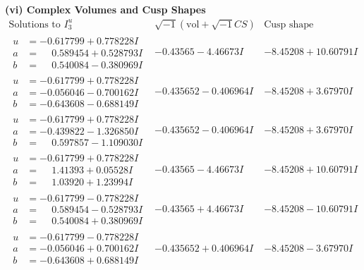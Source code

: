 \documentclass[1p]{elsarticle_modified}
\theoremstyle{definition}
\newcommand{\I}{\sqrt{-1}}
\begin{document}
\newpage\flushleft \textbf{(vi) Complex Volumes and Cusp Shapes}
$$\begin{array}{c|c|c}  
\text{Solutions to }I^u_{3}& \I (\text{vol} + \sqrt{-1}CS) & \text{Cusp shape}\\
 \hline 
\begin{aligned}
u &= -0.617799 + 0.778228 I \\
a &= \phantom{-}0.589454 + 0.528793 I \\
b &= \phantom{-}0.540084 - 0.380969 I\end{aligned}
 & -0.43565 - 4.46673 I & -8.45208 + 10.60791 I \\ \hline\begin{aligned}
u &= -0.617799 + 0.778228 I \\
a &= -0.056046 - 0.700162 I \\
b &= -0.643608 - 0.688149 I\end{aligned}
 & -0.435652 - 0.406964 I & -8.45208 + 3.67970 I \\ \hline\begin{aligned}
u &= -0.617799 + 0.778228 I \\
a &= -0.439822 - 1.326850 I \\
b &= \phantom{-}0.597857 - 1.109030 I\end{aligned}
 & -0.435652 - 0.406964 I & -8.45208 + 3.67970 I \\ \hline\begin{aligned}
u &= -0.617799 + 0.778228 I \\
a &= \phantom{-}1.41393 + 0.05528 I \\
b &= \phantom{-}1.03920 + 1.23994 I\end{aligned}
 & -0.43565 - 4.46673 I & -8.45208 + 10.60791 I \\ \hline\begin{aligned}
u &= -0.617799 - 0.778228 I \\
a &= \phantom{-}0.589454 - 0.528793 I \\
b &= \phantom{-}0.540084 + 0.380969 I\end{aligned}
 & -0.43565 + 4.46673 I & -8.45208 - 10.60791 I \\ \hline\begin{aligned}
u &= -0.617799 - 0.778228 I \\
a &= -0.056046 + 0.700162 I \\
b &= -0.643608 + 0.688149 I\end{aligned}
 & -0.435652 + 0.406964 I & -8.45208 - 3.67970 I \\ \hline\begin{aligned}

\end{aligned}
\end{array}$$
\end{document}
